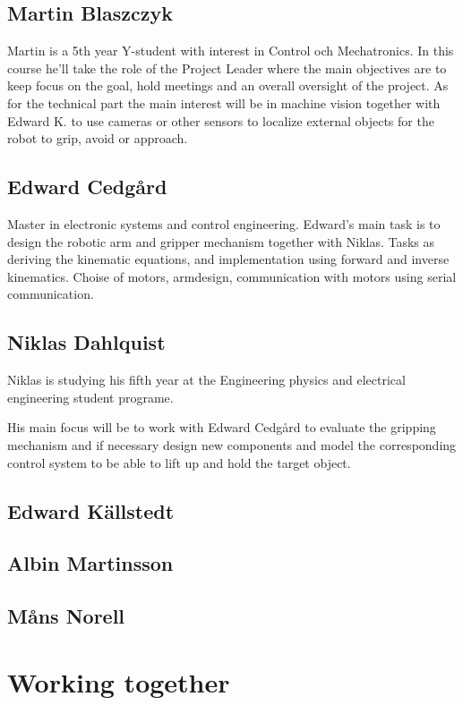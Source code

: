 
\section*{Martin Blaszczyk}
Martin is a 5th year Y-student with interest in Control och Mechatronics. 
In this course he'll take the role of the Project Leader where the main objectives
are to keep focus on the goal, hold meetings and an overall oversight of the project. 
As for the technical part the main interest will be in machine vision together with
Edward K. to use cameras or other sensors to localize external objects for the 
robot to grip, avoid or approach.

\section*{Edward Cedgård}

Master in  electronic systems and control engineering.
Edward's main task is to design the robotic arm and gripper mechanism together with Niklas. 
Tasks as deriving the kinematic equations, and implementation using forward and inverse kinematics.
Choise of motors, armdesign, communication with motors using serial communication. 

\section*{Niklas Dahlquist}
Niklas is studying his fifth year at the Engineering physics and electrical engineering student programe.

His main focus will be to work with Edward Cedgård to evaluate the gripping mechanism and if necessary design new components and model the corresponding control system to be able to lift up and hold the target object.
\section*{Edward Källstedt}


\section*{Albin Martinsson}


\section*{Måns Norell}


\chapter{Working together}
